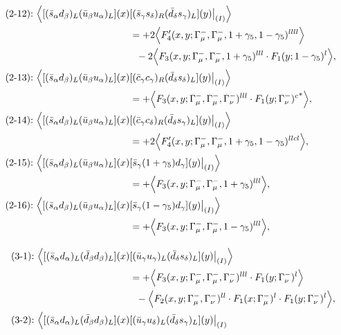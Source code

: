 \begin{align}
\\
\mbox{(2-12):}\ 
\Big\langle
[(\bar s_\alpha d_\beta)_L(\bar u_\beta u_\alpha)_L](x)&
[(\bar s_\gamma s_\delta)_R(\bar d_\delta s_\gamma)_L](y)\big|_{(I)}
\Big\rangle
\notag\\*
&=
 + 2\Big\langle F_4'(x,y;\Gamma_\mu^-,\Gamma_\mu^-,1+\gamma_5,1-\gamma_5)^{llll}\Big\rangle
\notag\\*&\ \ 
-2\Big\langle F_3(x,y;\Gamma_\mu^-,\Gamma_\mu^-,1+\gamma_5)^{lll} \cdot F_1(y;1-\gamma_5)^l\Big\rangle,
\\
\mbox{(2-13):}\ 
\Big\langle
[(\bar s_\alpha d_\beta)_L(\bar u_\beta u_\alpha)_L](x)&
[(\bar c_\gamma c_\gamma)_R(\bar d_\delta s_\delta)_L](y)\big|_{(I)}
\Big\rangle
\notag\\*
&=
 + \Big\langle F_3(x,y;\Gamma_\mu^-,\Gamma_\mu^-,\Gamma_\nu^-)^{lll} \cdot {F_1(y;\Gamma_\nu^-)^c}^*\Big\rangle,
\\
\mbox{(2-14):}\ 
\Big\langle
[(\bar s_\alpha d_\beta)_L(\bar u_\beta u_\alpha)_L](x)&
[(\bar c_\gamma c_\delta)_R(\bar d_\delta s_\gamma)_L](y)\big|_{(I)}
\Big\rangle
\notag\\*
&=
 + 2\Big\langle F_4'(x,y;\Gamma_\mu^-,\Gamma_\mu^-,1+\gamma_5,1-\gamma_5)^{llcl}\Big\rangle,
\\
\mbox{(2-15):}\ 
\Big\langle
[(\bar s_\alpha d_\beta)_L(\bar u_\beta u_\alpha)_L](x)&
[\bar s_\gamma (1 + \gamma_5) d_\gamma](y)\big|_{(I)}
\Big\rangle
\notag\\*
&=
 + \Big\langle F_3(x,y;\Gamma_\mu^-,\Gamma_\mu^-,1+\gamma_5)^{lll}\Big\rangle,
\\
\mbox{(2-16):}\ 
\Big\langle
[(\bar s_\alpha d_\beta)_L(\bar u_\beta u_\alpha)_L](x)&
[\bar s_\gamma (1 - \gamma_5) d_\gamma](y)\big|_{(I)}
\Big\rangle
\notag\\*
&=
 + \Big\langle F_3(x,y;\Gamma_\mu^-,\Gamma_\mu^-,1-\gamma_5)^{lll}\Big\rangle,
\\[3mm]
\mbox{(3-1):}\ 
\Big\langle
[(\bar s_\alpha d_\alpha)_L(\bar d_\beta d_\beta)_L](x)&
[(\bar u_\gamma u_\gamma)_L(\bar d_\delta s_\delta)_L](y)\big|_{(I)}
\Big\rangle
\notag\\*
&=
 + \Big\langle F_3(x,y;\Gamma_\mu^-,\Gamma_\mu^-,\Gamma_\nu^-)^{lll} \cdot F_1(y;\Gamma_\nu^-)^l\Big\rangle
\notag\\*&\ \ 
 - \Big\langle F_2(x,y;\Gamma_\mu^-,\Gamma_\nu^-)^{ll} \cdot F_1(x;\Gamma_\mu^-)^l \cdot F_1(y;\Gamma_\nu^-)^l\Big\rangle,
\\
\mbox{(3-2):}\ 
\Big\langle
[(\bar s_\alpha d_\alpha)_L(\bar d_\beta d_\beta)_L](x)&
[(\bar u_\gamma u_\delta)_L(\bar d_\delta s_\gamma)_L](y)\big|_{(I)}

\end{align}
